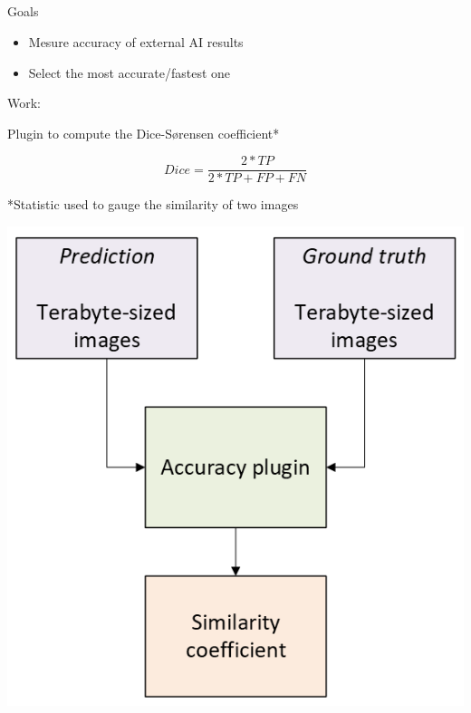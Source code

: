 \subsection{\slidetitle}
\begin{frame}
  \frametitle{\sectiontitle}
  \framesubtitle{\slidetitle}

  \begin{minipage}[h!]{0.65\textwidth}

    Goals
    \begin{itemize}
      \item Mesure accuracy of external AI results
      \item Select the most accurate/fastest one
    \end{itemize}

    \bigskip

    Work:

    Plugin to compute the Dice-Sørensen coefficient*

    \[ Dice = \frac{2*TP}{2*TP + FP + FN} \]

    \bigskip
    \bigskip

    *Statistic used to gauge the similarity of two images
  \end{minipage}\hfill
  \begin{minipage}[h!]{0.35\textwidth}
    \includegraphics[scale=0.55]{./img/2_ai-plugins/accuracy.png}
  \end{minipage}
\end{frame}
